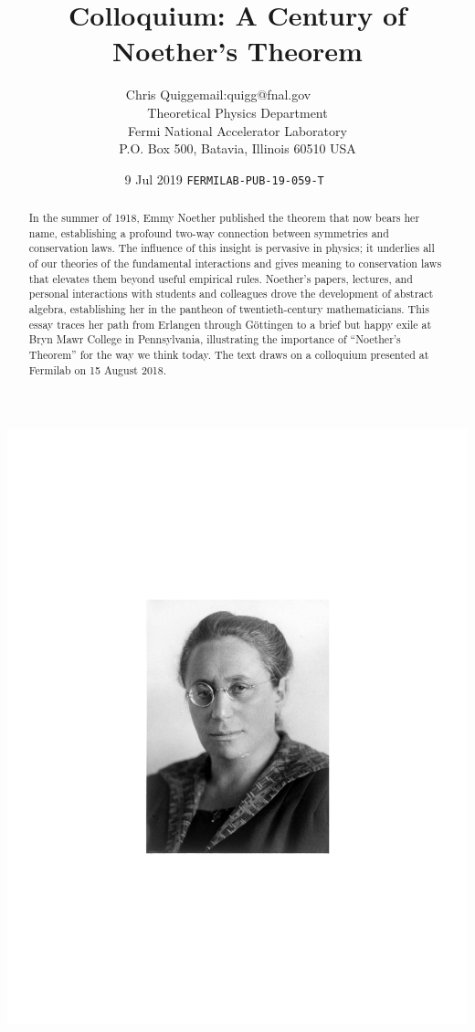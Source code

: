 \documentclass[twoside,symmetric]{tufte-handout}
\title{Colloquium: A Century of Noether's Theorem}%
\author[Chris Quigg]{Chris Quigg\hfill{\small email:quigg@fnal.gov~~~~~~}\\
{\normalsize Theoretical Physics Department\\ Fermi National Accelerator
Laboratory\\ P.O. Box 500, Batavia, Illinois 60510 USA}}
\date{{9 Jul 2019 }\hfill {\texttt{\hbox{\small FERMILAB-PUB-19-059-T~~~~}}}} %
\begin{document}
\maketitle%
\begin{marginfigure}[112pt]
\centering
\includegraphics[width=0.75\columnwidth]{EmmyFigs/Emmy_NoetherBMarchiveC2algray}
\end{marginfigure}
\begin{abstract}
\noindent
In the summer of 1918, Emmy Noether published the theorem that now bears her name, establishing a profound two-way connection between symmetries and conservation laws. The influence of this insight is pervasive in physics; it underlies all of our theories of the fundamental interactions and gives meaning to conservation laws that elevates them beyond useful empirical rules. Noether's papers, lectures, and personal interactions with students and colleagues drove the development of abstract algebra, establishing her in the pantheon of twentieth-century mathematicians. This essay traces her path from Erlangen through G\"ottingen to a brief but happy exile at Bryn Mawr College in Pennsylvania, illustrating the importance of ``Noether's Theorem'' for the way we think today. The text draws on a colloquium presented at Fermilab on 15 August 2018.
\end{abstract}
\end{document}
